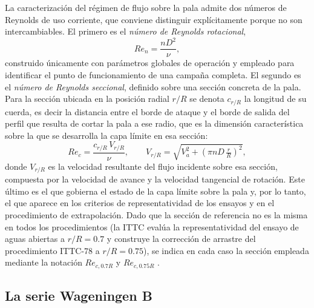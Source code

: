La caracterización del régimen de flujo sobre la pala admite dos números de Reynolds de uso corriente, que conviene distinguir explícitamente porque no son intercambiables. El primero es el \emph{número de Reynolds rotacional},
%
\begin{equation} \label{eq:Re_rotacional}
    Re_n = \frac{n D^2}{\nu},
\end{equation}
%
construido únicamente con parámetros globales de operación y empleado para identificar el punto de funcionamiento de una campaña completa. El segundo es el \emph{número de Reynolds seccional}, definido sobre una sección concreta de la pala. Para la sección ubicada en la posición radial $r/R$ se denota $c_{r/R}$ la longitud de su cuerda, es decir la distancia entre el borde de ataque y el borde de salida del perfil que resulta de cortar la pala a ese radio, que es la dimensión característica sobre la que se desarrolla la capa límite en esa sección:
%
\begin{equation} \label{eq:Re_helice}
    Re_c = \frac{c_{r/R}\, V_{r/R}}{\nu}, \qquad V_{r/R} = \sqrt{V_a^2 + \left(\pi n D\, \tfrac{r}{R}\right)^2},
\end{equation}
%
donde $V_{r/R}$ es la velocidad resultante del flujo incidente sobre esa sección, compuesta por la velocidad de avance y la velocidad tangencial de rotación. Este último es el que gobierna el estado de la capa límite sobre la pala y, por lo tanto, el que aparece en los criterios de representatividad de los ensayos y en el procedimiento de extrapolación. Dado que la sección de referencia no es la misma en todos los procedimientos (la ITTC evalúa la representatividad del ensayo de aguas abiertas a $r/R = 0.7$ y construye la corrección de arrastre del procedimiento ITTC-78 a $r/R = 0.75$), se indica en cada caso la sección empleada mediante la notación $Re_{c,0.7R}$ y $Re_{c,0.75R}$ \citep{ITTC_Performance_prediction}.
 
\subsection{La serie Wageningen B}
\label{sec:wageningen_antec}
 

